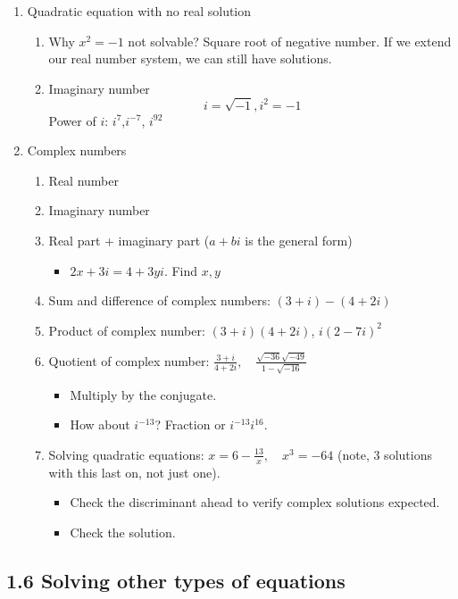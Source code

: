 \documentclass{article}
\begin{document}
\begin{enumerate}
\item Quadratic equation with no real solution
\begin{enumerate}
\item Why $x^2=-1$ not solvable? Square root of negative number. If we extend our real number system, we can still have solutions.
\item Imaginary number 
$$
i = \sqrt{-1}, i^2 = -1
$$
Power of $i$: $i^7$,$i^{-7}$, $i^{92}$
\end{enumerate}

\item Complex numbers
\begin{enumerate}
\item Real number
\item Imaginary number
\item Real part + imaginary part ($a+bi$ is the general form)
\begin{itemize}
\item $2x + 3 i = 4+ 3y i$. Find $x, y$
\end{itemize}
\item Sum and difference of complex numbers: $(3+i)-(4+2i)$
\item Product of complex number: $(3+i)(4+2i)$, \quad $i(2-7i)^2$
\item Quotient of complex number: $\displaystyle \frac{3+i}{4+2i}, \quad \frac{\sqrt{-36}\sqrt{-49}}{1-\sqrt{-16}}$
\begin{itemize}
\item Multiply by the conjugate. 
\item How about $i^{-13}$? Fraction or $i^{-13}i^{16}$. 
\end{itemize}
\item Solving quadratic equations: $\displaystyle x=6-\frac{13}{x}, \quad x^3 = -64$ (note, 3 solutions with this last on, not just one).  
\begin{itemize}
\item Check the discriminant ahead to verify complex solutions expected. 
\item Check the solution.
\end{itemize}
\end{enumerate}
\end{enumerate}


\subsection{1.6 Solving other types of equations}
\end{document}
